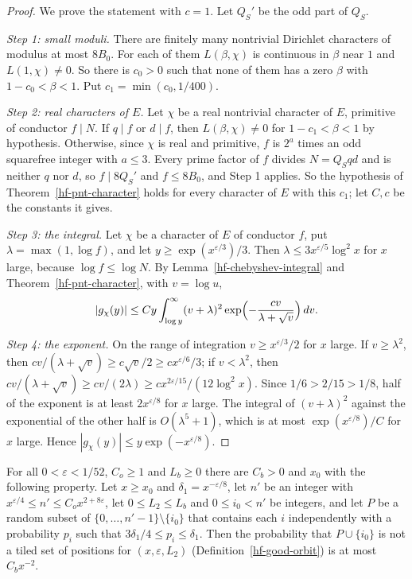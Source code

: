 \begin{proof}
We prove the statement with $c=1$. Let $Q_S'$ be the odd part of $Q_S$.

\emph{Step 1: small moduli.} There are finitely many nontrivial Dirichlet characters of modulus at
most $8B_0$. For each of them $L(\beta,\chi)$ is continuous in $\beta$ near $1$ and
$L(1,\chi)\neq0$. So there is $c_0>0$ such that none of them has a zero $\beta$ with
$1-c_0<\beta<1$. Put $c_1=\min(c_0,1/400)$.

\emph{Step 2: real characters of $E$.} Let $\chi$ be a real nontrivial character of $E$, primitive
of conductor $f\mid N$. If $q\mid f$ or $d\mid f$, then $L(\beta,\chi)\neq0$ for $1-c_1<\beta<1$ by
hypothesis. Otherwise, since $\chi$ is real and primitive, $f$ is $2^a$ times an odd squarefree
integer with $a\leq3$. Every prime factor of $f$ divides $N=Q_Sqd$ and is neither $q$ nor $d$, so
$f\mid8Q_S'$ and $f\leq8B_0$, and Step 1 applies. So the hypothesis of
Theorem~\ref{hf-pnt-character} holds for every character of $E$ with this $c_1$; let $C,c$ be the
constants it gives.

\emph{Step 3: the integral.} Let $\chi$ be a character of $E$ of conductor $f$, put
$\lambda=\max(1,\log f)$, and let $y\geq\exp(x^{\varepsilon/3})/3$. Then
$\lambda\leq3x^{\varepsilon/5}\log^2x$ for $x$ large, because $\log f\leq\log N$. By
Lemma~\ref{hf-chebyshev-integral} and Theorem~\ref{hf-pnt-character}, with $v=\log u$,
\[
 |g_\chi(y)|\leq Cy\int_{\log y}^\infty(v+\lambda)^2\exp\Bigl(-\frac{cv}{\lambda+\sqrt v}\Bigr)\,dv.
\]

\emph{Step 4: the exponent.} On the range of integration $v\geq x^{\varepsilon/3}/2$ for $x$ large.
If $v\geq\lambda^2$, then $cv/(\lambda+\sqrt v)\geq c\sqrt v/2\geq cx^{\varepsilon/6}/3$; if
$v<\lambda^2$, then $cv/(\lambda+\sqrt v)\geq cv/(2\lambda)\geq cx^{2\varepsilon/15}/(12\log^2x)$.
Since $1/6>2/15>1/8$, half of the exponent is at least $2x^{\varepsilon/8}$ for $x$ large. The
integral of $(v+\lambda)^2$ against the exponential of the other half is $O(\lambda^5+1)$, which is
at most $\exp(x^{\varepsilon/8})/C$ for $x$ large. Hence $|g_\chi(y)|\leq y\exp(-x^{\varepsilon/8})$.
\end{proof}

\begin{lemma}\label{hf-orbit-failure}
For all $0<\varepsilon<1/52$, $C_o\geq1$ and $L_b\geq0$ there are $C_b>0$ and $x_0$ with the
following property. Let $x\geq x_0$ and $\delta_1=x^{-\varepsilon/8}$, let $n'$ be an integer with
$x^{\varepsilon/4}\leq n'\leq C_ox^{2+8\varepsilon}$, let $0\leq L_2\leq L_b$ and $0\leq i_0<n'$ be
integers, and let $P$ be a random subset of $\{0,\ldots,n'-1\}\setminus\{i_0\}$ that contains each
$i$ independently with a probability $p_i$ such that $3\delta_1/4\leq p_i\leq\delta_1$. Then the
probability that $P\cup\{i_0\}$ is not a tiled set of positions for $(x,\varepsilon,L_2)$
(Definition~\ref{hf-good-orbit}) is at most $C_bx^{-2}$.
\end{lemma}

